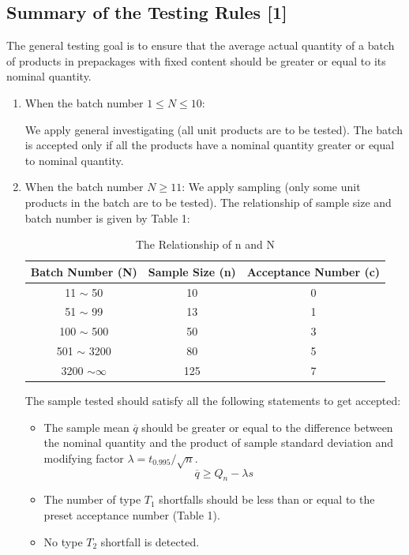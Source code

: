 \documentclass[a4paper]{article}
\begin{document}
\subsection{Summary of the Testing Rules [1]}
The general testing goal is to ensure that the average actual quantity of a batch of products in prepackages with fixed content should be greater or equal to its nominal quantity.

\begin{enumerate}
\item When the batch number $1\leq N \leq 10$:

We apply general investigating (all unit products are to be tested). The batch is accepted only if all the products have a nominal quantity greater or equal to nominal quantity.
\item When the batch number $N\geq 11$:
We apply sampling (only some unit products in the batch are to be tested). The relationship of sample size and batch number is given by Table 1:

\begin{table}[!htbp]
  \centering
    \begin{tabular}{ccc}
    \hline
    Batch Number (N) & Sample Size (n) & Acceptance Number (c)\\
    \hline
    11 $\sim$ 50 & 10 & 0\\
    51 $\sim$ 99 & 13 & 1\\
    100 $\sim$ 500 & 50 & 3\\
    501 $\sim$ 3200 & 80 & 5\\
    3200 $\sim\infty$ & 125 & 7\\
    \hline
    \end{tabular}%
    \caption{The Relationship of n and N}
\end{table}

The sample tested should satisfy all the following statements to get accepted:
	\begin{itemize}
	\item The sample mean $\overline{q}$ should be greater or equal to the difference between the nominal quantity and the product of sample standard deviation and modifying factor $\lambda = t_{0.995}/\sqrt{n}$.
	$$\overline{q} \geq Q_n - \lambda s$$
	\item The number of type $T_1$ shortfalls should be less than or equal to the preset acceptance number (Table 1).
	\item No type $T_2$ shortfall is detected.
	\end{itemize}
\end{enumerate}
\end{document}
